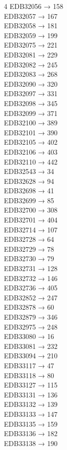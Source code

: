 \begin{multicols}{4}
EDB32056 → 158\\
EDB32057 → 167\\
EDB32058 → 181\\
EDB32059 → 199\\
EDB32075 → 221\\
EDB32081 → 229\\
EDB32082 → 245\\
EDB32083 → 268\\
EDB32090 → 320\\
EDB32097 → 331\\
EDB32098 → 345\\
EDB32099 → 371\\
EDB32100 → 389\\
EDB32101 → 390\\
EDB32105 → 402\\
EDB32106 → 403\\
EDB32110 → 442\\
EDB32543 → 34\\
EDB32628 → 94\\
EDB32698 → 41\\
EDB32699 → 85\\
EDB32700 → 308\\
EDB32701 → 404\\
EDB32714 → 107\\
EDB32728 → 64\\
EDB32729 → 78\\
EDB32730 → 79\\
EDB32731 → 128\\
EDB32732 → 146\\
EDB32736 → 405\\
EDB32852 → 247\\
EDB32878 → 60\\
EDB32879 → 346\\
EDB32975 → 248\\
EDB33080 → 16\\
EDB33081 → 232\\
EDB33094 → 210\\
EDB33117 → 47\\
EDB33118 → 80\\
EDB33127 → 115\\
EDB33131 → 136\\
EDB33132 → 139\\
EDB33133 → 147\\
EDB33135 → 159\\
EDB33136 → 182\\
EDB33138 → 190\\

\end{multicols}
